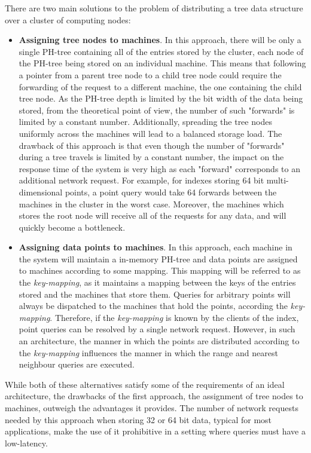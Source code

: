 \documentclass[11pt,a4paper]{globis-book}
\begin{document}
There are two main solutions to the problem of distributing a tree data structure over a cluster of computing nodes: 
\begin{itemize}
    \item \textbf{Assigning tree nodes to machines}. In this approach, there will be only a single PH-tree containing all of the entries stored by the cluster, each node of the PH-tree being stored on an individual machine. This means that following a pointer from a parent tree node to a child tree node could require the forwarding of the request to a different machine, the one containing the child tree node. As the PH-tree depth is limited by the bit width of the data being stored, from the theoretical point of view, the number of such "forwards" is limited by a constant number. Additionally, spreading the tree nodes uniformly across the machines will lead to a balanced storage load. The drawback of this approach is that even though the number of "forwards" during a tree travels is limited by a constant number, the impact on the response time of the system is very high as each "forward" corresponds to an additional network request. For example, for indexes storing 64 bit multi-dimensional points, a point query would take 64 forwards between the machines in the cluster in the worst case. Moreover, the machines which stores the root node will receive all of the requests for any data, and will quickly become a bottleneck. 
    \item \textbf{Assigning data points to machines}. In this approach, each machine in the system will maintain a in-memory PH-tree and data points are assigned to machines according to some mapping. This mapping will be referred to as the \textit{key-mapping}, as it maintains a mapping between the keys of the entries stored and the machines that store them. Queries for arbitrary points will always be dispatched to the machines that hold the points, according the \textit{key-mapping}. Therefore, if the \textit{key-mapping} is known by the clients of the index, point queries can be resolved by a single network request. However, in such an architecture, the manner in which the points are distributed according to the \textit{key-mapping} influences the manner in which the range and nearest neighbour queries are executed. 
\end{itemize}

While both of these alternatives satisfy some of the requirements of an ideal architecture, the drawbacks of the first approach, the assignment of tree nodes to machines, outweigh the advantages it provides. The number of network requests needed by this approach when storing 32 or 64 bit data, typical for most applications, make the use of it prohibitive in a setting where queries must have a low-latency.
\end{document}
